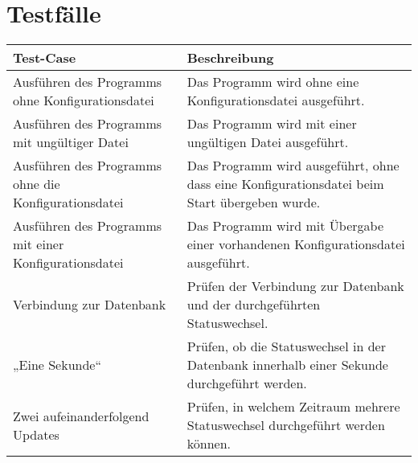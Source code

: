 \documentclass{scrartcl}
\begin{document}
\section{Testfälle}
\begin{tabular}{L{.3} | L{.65}}
	Test-Case & Beschreibung \\\hline\hline
	Ausführen des Programms ohne Konfigurationsdatei & Das Programm wird ohne eine Konfigurationsdatei ausgeführt. \\\hline
	Ausführen des Programms mit ungültiger Datei & Das Programm wird mit einer ungültigen Datei ausgeführt. \\\hline
	Ausführen des Programms ohne die Konfigurationsdatei & Das Programm wird ausgeführt, ohne dass eine Konfigurationsdatei beim Start übergeben wurde. \\\hline
	Ausführen des Programms mit einer Konfigurationsdatei & Das Programm wird mit Übergabe einer vorhandenen Konfigurationsdatei ausgeführt. \\\hline
	Verbindung zur Datenbank & Prüfen der Verbindung zur Datenbank und der durchgeführten Statuswechsel. \\\hline
	„Eine Sekunde“ & Prüfen, ob die Statuswechsel in der Datenbank innerhalb einer Sekunde durchgeführt werden. \\\hline
	Zwei aufeinanderfolgend Updates & Prüfen, in welchem Zeitraum mehrere Statuswechsel durchgeführt werden können.
\end{tabular}
\end{document}
